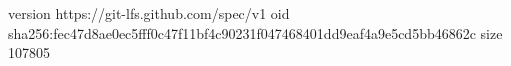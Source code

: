 version https://git-lfs.github.com/spec/v1
oid sha256:fec47d8ae0ec5fff0c47f11bf4c90231f047468401dd9eaf4a9e5cd5bb46862c
size 107805
